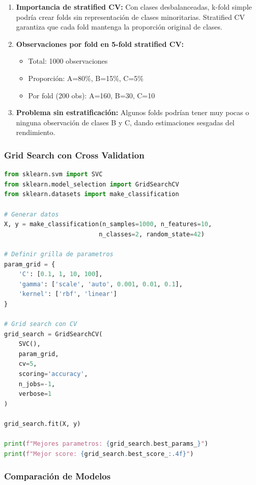 \documentclass[12pt]{article}
\begin{document}
\begin{enumerate}
    \item \textbf{Importancia de stratified CV:} Con clases desbalanceadas, k-fold simple podría crear folds sin representación de clases minoritarias. Stratified CV garantiza que cada fold mantenga la proporción original de clases.
    
    \item \textbf{Observaciones por fold en 5-fold stratified CV:}
    \begin{itemize}
        \item Total: 1000 observaciones
        \item Proporción: A=80\%, B=15\%, C=5\%
        \item Por fold (200 obs): A=160, B=30, C=10
    \end{itemize}
    
    \item \textbf{Problema sin estratificación:} Algunos folds podrían tener muy pocas o ninguna observación de clases B y C, dando estimaciones sesgadas del rendimiento.
\end{enumerate}

\subsubsection{Grid Search con Cross Validation}

\begin{lstlisting}[language=Python]
from sklearn.svm import SVC
from sklearn.model_selection import GridSearchCV
from sklearn.datasets import make_classification

# Generar datos
X, y = make_classification(n_samples=1000, n_features=10, 
                          n_classes=2, random_state=42)

# Definir grilla de parametros
param_grid = {
    'C': [0.1, 1, 10, 100],
    'gamma': ['scale', 'auto', 0.001, 0.01, 0.1],
    'kernel': ['rbf', 'linear']
}

# Grid search con CV
grid_search = GridSearchCV(
    SVC(), 
    param_grid, 
    cv=5, 
    scoring='accuracy',
    n_jobs=-1,
    verbose=1
)

grid_search.fit(X, y)

print(f"Mejores parametros: {grid_search.best_params_}")
print(f"Mejor score: {grid_search.best_score_:.4f}")
\end{lstlisting}

\subsubsection{Comparación de Modelos}
\end{document}
